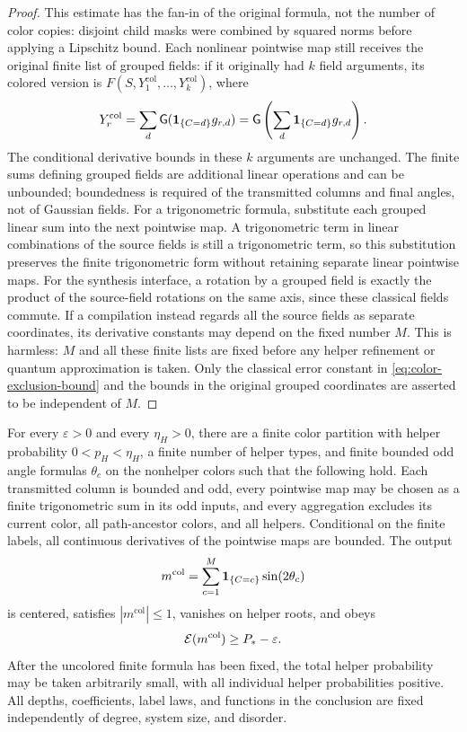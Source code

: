 \begin{proof}
This estimate has the fan-in of the original formula, not the number
of color copies: disjoint child masks were combined by squared
norms before applying a Lipschitz bound.  Each nonlinear pointwise
map still receives the original finite list of grouped fields: if
it originally had $k$ field arguments, its colored version is
$F(S,Y_1^{\mathrm{col}},\ldots,Y_k^{\mathrm{col}})$, where
\[
 Y_r^{\mathrm{col}}=\sum_d\mathsf G(\mathbf 1_{\{C=d\}}g_{r,d})
       =\mathsf G\left(\sum_d\mathbf 1_{\{C=d\}}g_{r,d}\right).
\]
The conditional derivative bounds in these $k$ arguments are
unchanged.  The finite sums defining grouped fields are additional
linear operations and can be unbounded; boundedness is required of
the transmitted columns and final angles, not of Gaussian fields.
For a trigonometric formula, substitute each grouped linear sum into
the next pointwise map.  A trigonometric term in linear combinations
of the source fields is still a trigonometric term, so this substitution
preserves the finite trigonometric form without retaining separate
linear pointwise maps.
For the synthesis interface, a rotation by a grouped field is
exactly the product of the source-field rotations on the same axis,
since these classical fields commute.  If a compilation instead
regards all the source fields as separate coordinates, its
derivative constants may depend on the fixed number $M$.  This is
harmless: $M$ and all these finite lists are fixed before any helper
refinement or quantum approximation is taken.  Only the classical
error constant in \eqref{eq:color-exclusion-bound} and the bounds in
the original grouped coordinates are asserted to be independent
of $M$.
\end{proof}

\begin{proposition}
\label{prop:classical-near-optimum}
For every $\varepsilon>0$ and every $\eta_H>0$, there are a finite
color partition with helper probability $0<p_H<\eta_H$, a finite
number of helper types, and finite bounded odd angle formulas
$\theta_c$ on the nonhelper colors such that the following hold.
Each transmitted column is bounded and odd, every pointwise map
may be chosen as a finite trigonometric sum in its odd inputs, and
every aggregation excludes its current color, all path-ancestor
colors, and all helpers.  Conditional on the finite labels, all
continuous derivatives of the pointwise maps are bounded.  The
output
\begin{equation}
 m^{\mathrm{col}}
  =\sum_{c=1}^M\mathbf 1_{\{C=c\}}\sin(2\theta_c)
 \label{eq:final-classical-formula}
\end{equation}
is centered, satisfies $|m^{\mathrm{col}}|\le1$, vanishes on helper
roots, and obeys
\begin{equation}
 \mathcal E(m^{\mathrm{col}})\ge P_*-\varepsilon.
 \label{eq:final-classical-value}
\end{equation}
After the uncolored finite formula has been fixed, the total helper
probability may be taken arbitrarily small, with all individual
helper probabilities positive.  All depths, coefficients, label laws,
and functions in the conclusion are fixed independently of degree,
system size, and disorder.
\end{proposition}

